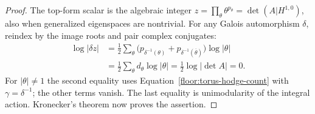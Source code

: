 \begin{proof}
The top-form scalar is the algebraic integer
\(z=\prod_\theta \theta^{p_\theta}=\det(A|H^{1,0})\), also when generalized eigenspaces
are nontrivial.  For any Galois automorphism \(\delta\), reindex by the
image roots and pair complex conjugates:
\[
 \begin{aligned}
 \log|\delta z|
 &=\frac12\sum_\theta
       \bigl(p_{\delta^{-1}(\theta)}
             +p_{\delta^{-1}(\overline\theta)}\bigr)\log|\theta|\\
 &=\frac12\sum_\theta d_\theta\log|\theta|
   =\tfrac12\log|\det A|=0.
 \end{aligned}
\]
For \(|\theta|\ne1\) the second equality uses
Equation~\eqref{floor:torus-hodge-count} with \(\gamma=\delta^{-1}\); the other
terms vanish.  The last equality is unimodularity of the integral action.
Kronecker's theorem now proves the assertion.
\end{proof}

